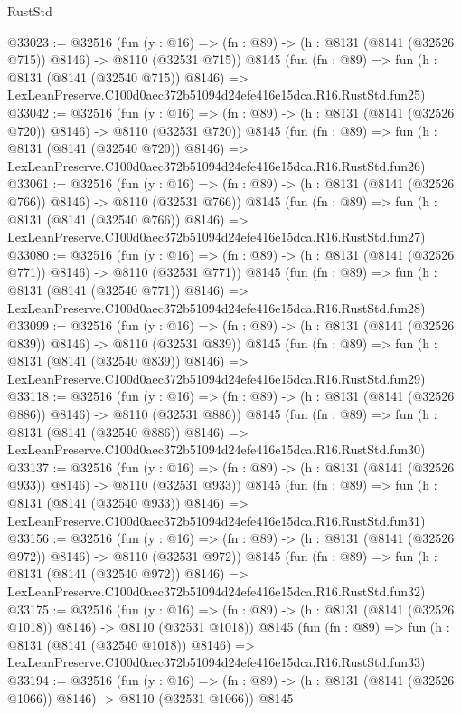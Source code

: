 \begin{lexlean}{RustStd}
\begin{coremodule}
@33023 := @32516
    (fun (y : @16) => (fn : @89) -> (h : @8131 (@8141 (@32526 @715)) @8146) -> @8110 (@32531 @715))
    @8145
    (fun (fn : @89) =>
    fun (h : @8131 (@8141 (@32540 @715)) @8146) =>
    LexLeanPreserve.C100d0aec372b51094d24efe416e15dca.R16.RustStd.fun25)
@33042 := @32516
    (fun (y : @16) => (fn : @89) -> (h : @8131 (@8141 (@32526 @720)) @8146) -> @8110 (@32531 @720))
    @8145
    (fun (fn : @89) =>
    fun (h : @8131 (@8141 (@32540 @720)) @8146) =>
    LexLeanPreserve.C100d0aec372b51094d24efe416e15dca.R16.RustStd.fun26)
@33061 := @32516
    (fun (y : @16) => (fn : @89) -> (h : @8131 (@8141 (@32526 @766)) @8146) -> @8110 (@32531 @766))
    @8145
    (fun (fn : @89) =>
    fun (h : @8131 (@8141 (@32540 @766)) @8146) =>
    LexLeanPreserve.C100d0aec372b51094d24efe416e15dca.R16.RustStd.fun27)
@33080 := @32516
    (fun (y : @16) => (fn : @89) -> (h : @8131 (@8141 (@32526 @771)) @8146) -> @8110 (@32531 @771))
    @8145
    (fun (fn : @89) =>
    fun (h : @8131 (@8141 (@32540 @771)) @8146) =>
    LexLeanPreserve.C100d0aec372b51094d24efe416e15dca.R16.RustStd.fun28)
@33099 := @32516
    (fun (y : @16) => (fn : @89) -> (h : @8131 (@8141 (@32526 @839)) @8146) -> @8110 (@32531 @839))
    @8145
    (fun (fn : @89) =>
    fun (h : @8131 (@8141 (@32540 @839)) @8146) =>
    LexLeanPreserve.C100d0aec372b51094d24efe416e15dca.R16.RustStd.fun29)
@33118 := @32516
    (fun (y : @16) => (fn : @89) -> (h : @8131 (@8141 (@32526 @886)) @8146) -> @8110 (@32531 @886))
    @8145
    (fun (fn : @89) =>
    fun (h : @8131 (@8141 (@32540 @886)) @8146) =>
    LexLeanPreserve.C100d0aec372b51094d24efe416e15dca.R16.RustStd.fun30)
@33137 := @32516
    (fun (y : @16) => (fn : @89) -> (h : @8131 (@8141 (@32526 @933)) @8146) -> @8110 (@32531 @933))
    @8145
    (fun (fn : @89) =>
    fun (h : @8131 (@8141 (@32540 @933)) @8146) =>
    LexLeanPreserve.C100d0aec372b51094d24efe416e15dca.R16.RustStd.fun31)
@33156 := @32516
    (fun (y : @16) => (fn : @89) -> (h : @8131 (@8141 (@32526 @972)) @8146) -> @8110 (@32531 @972))
    @8145
    (fun (fn : @89) =>
    fun (h : @8131 (@8141 (@32540 @972)) @8146) =>
    LexLeanPreserve.C100d0aec372b51094d24efe416e15dca.R16.RustStd.fun32)
@33175 := @32516
    (fun (y : @16) =>
    (fn : @89) -> (h : @8131 (@8141 (@32526 @1018)) @8146) -> @8110 (@32531 @1018))
    @8145
    (fun (fn : @89) =>
    fun (h : @8131 (@8141 (@32540 @1018)) @8146) =>
    LexLeanPreserve.C100d0aec372b51094d24efe416e15dca.R16.RustStd.fun33)
@33194 := @32516
    (fun (y : @16) =>
    (fn : @89) -> (h : @8131 (@8141 (@32526 @1066)) @8146) -> @8110 (@32531 @1066))
    @8145

\end{coremodule}
\end{lexlean}

